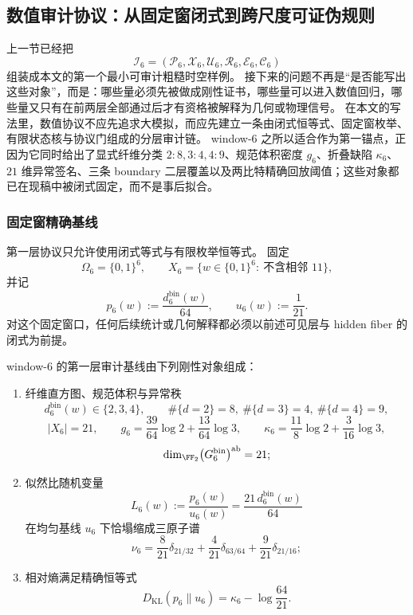 \subsection{数值审计协议：从固定窗闭式到跨尺度可证伪规则}\label{subsec:typed-address-biaxial-completion-window6-numerical-audit-protocol}
上一节已经把
\[
\mathcal I_6
=
(\mathcal P_6,\mathcal X_6,\mathcal U_6,\mathcal R_6,\mathcal E_6,\mathcal C_6)
\]
组装成本文的第一个最小可审计粗糙时空样例。
接下来的问题不再是“是否能写出这些对象”，而是：哪些量必须先被做成刚性证书，哪些量可以进入数值回归，哪些量又只有在前两层全部通过后才有资格被解释为几何或物理信号。
在本文的写法里，数值协议不应先追求大模拟，而应先建立一条由闭式恒等式、固定窗枚举、有限状态核与协议门组成的分层审计链。
window-\(6\) 之所以适合作为第一锚点，正因为它同时给出了显式纤维分类 \(2{:}8,3{:}4,4{:}9\)、规范体积密度 \(g_6\)、折叠缺陷 \(\kappa_6\)、\(21\) 维异常签名、三条 boundary 二层覆盖以及两比特精确回放阈值；这些对象都已在现稿中被闭式固定，而不是事后拟合。

\subsubsection{固定窗精确基线}\label{subsubsec:typed-address-biaxial-completion-window6-numerical-audit-fixed-window-baseline}
第一层协议只允许使用闭式等式与有限枚举恒等式。
固定
\[
\Omega_6=\{0,1\}^6,
\qquad
X_6=\{w\in\{0,1\}^6:\ \text{不含相邻 }11\},
\]
并记
\[
p_6(w):=\frac{d_6^{\mathrm{bin}}(w)}{64},
\qquad
u_6(w):=\frac1{21}.
\]
对这个固定窗口，任何后续统计或几何解释都必须以前述可见层与 hidden fiber 的闭式为前提。

\begin{proposition}\label{prop:typed-address-biaxial-completion-window6-audit-fixed-baseline}
window-\(6\) 的第一层审计基线由下列刚性对象组成：
\begin{enumerate}
  \item 纤维直方图、规范体积与异常秩
  \[
  d_6^{\mathrm{bin}}(w)\in\{2,3,4\},
  \qquad
  \#\{d=2\}=8,\ \#\{d=3\}=4,\ \#\{d=4\}=9,
  \]
  \[
  |X_6|=21,
  \qquad
  g_6=\frac{39}{64}\log 2+\frac{13}{64}\log 3,
  \qquad
  \kappa_6=\frac{11}{8}\log 2+\frac{3}{16}\log 3,
  \]
  \[
  \dim_{\FF_2}\bigl(G_6^{\mathrm{bin}}\bigr)^{\mathrm{ab}}=21;
  \]
  \item 似然比随机变量
  \[
  L_6(w):=\frac{p_6(w)}{u_6(w)}=\frac{21\,d_6^{\mathrm{bin}}(w)}{64}
  \]
  在均匀基线 \(u_6\) 下恰塌缩成三原子谱
  \[
  \nu_6
  =
  \frac8{21}\delta_{21/32}
  +\frac4{21}\delta_{63/64}
  +\frac9{21}\delta_{21/16};
  \]
  \item 相对熵满足精确恒等式
  \[
  D_{\mathrm{KL}}(p_6\|u_6)=\kappa_6-\log\frac{64}{21}.
  \]
\end{enumerate}
\end{proposition}

